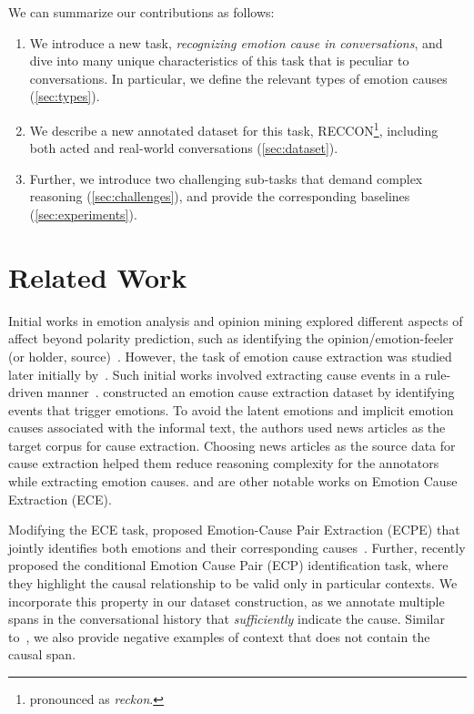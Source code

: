 \documentclass[11pt,a4paper]{article}
\theoremstyle{definition}
\newcommand\RECCON{\emph{recognizing emotion cause in conversations}}
\newcommand\RECCONDA{RECCON}
\begin{document}
We can summarize our contributions as follows:



\begin{enumerate}[leftmargin=*]
\item We introduce a new task, \RECCON{}, and dive into many unique characteristics of this task that is peculiar to conversations. 
In particular, we define the relevant types of emotion causes (\cref{sec:types}). 
     \item We describe a new annotated dataset for this task, \RECCONDA{}\footnote{pronounced as \textit{reckon}.}, including both acted and real-world conversations (\cref{sec:dataset}).
     \item Further, we introduce two challenging sub-tasks that demand complex reasoning (\cref{sec:challenges}), and provide the corresponding baselines (\cref{sec:experiments}).
\end{enumerate}

\section{Related Work} \label{sec:related_works}

Initial works in emotion analysis and opinion mining explored different aspects of affect beyond polarity prediction, such as identifying the opinion/emotion-feeler (or holder, source)~\cite{das-bandyopadhyay-2010-finding,DBLP:conf/naacl/ChoiCRP05}. However, the task of emotion cause extraction was studied later initially by~\citet{lee-etal-2010-text}. Such initial works involved extracting cause events in a rule-driven manner~\cite{chen-etal-2010-emotion}. \citet{gui2016event} constructed an emotion cause extraction dataset by identifying events that trigger emotions. To avoid the latent emotions and implicit emotion causes associated with the informal text, the authors used news articles as the target corpus for cause extraction. Choosing news articles as the source data for cause extraction helped them reduce reasoning complexity for the annotators while extracting emotion causes. \citet{DBLP:conf/cicling/GhaziIS15} and \citet{gao2017overview} are other notable works on Emotion Cause Extraction (ECE).







Modifying the ECE task, \citet{DBLP:conf/acl/XiaD19} proposed Emotion-Cause Pair Extraction (ECPE) that jointly identifies both emotions and their corresponding causes~\cite{DBLP:conf/emnlp/ChenHCL18}. Further, \citet{chen-etal-2020-conditional} recently proposed the conditional Emotion Cause Pair (ECP) identification task, where they highlight the causal relationship to be valid only in particular contexts. We incorporate this property in our dataset construction, as we annotate multiple spans in the conversational history that \textit{sufficiently} indicate the cause. Similar to~\citet{chen-etal-2020-conditional}, we also provide negative examples of context that does not contain the causal span. 
\end{document}
